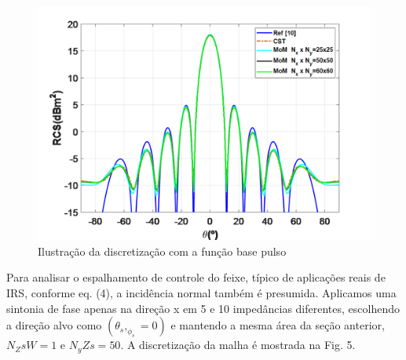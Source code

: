 \documentclass[
	12pt,				%
	openright,			%
	oneside,			%
	a4paper,			%
	english,			%
	brazil				%
	]{abntex2}
\begin{document}
\begin{figure}[htb]
 \label{DiscretizaçãoXY}
    \centering
    \caption{Ilustração da discretização  com a função base pulso} \label{fig_minipage}
    \includegraphics[width=\textwidth]{figures/RCSMeshValidationYoz.png}
  \hfill
\end{figure}

Para analisar o espalhamento de controle do feixe, típico de aplicações reais de IRS, conforme eq. (4), a incidência normal também é presumida. Aplicamos uma sintonia de fase apenas na direção x em 5 e 10 impedâncias diferentes, escolhendo a direção alvo como $(\theta_s,_\phi_s=0)$ e mantendo a mesma área da seção anterior, $N_ZsW=1$ e $N_yZs=50$. A discretização da malha é mostrada na Fig. 5. 
\end{document}

